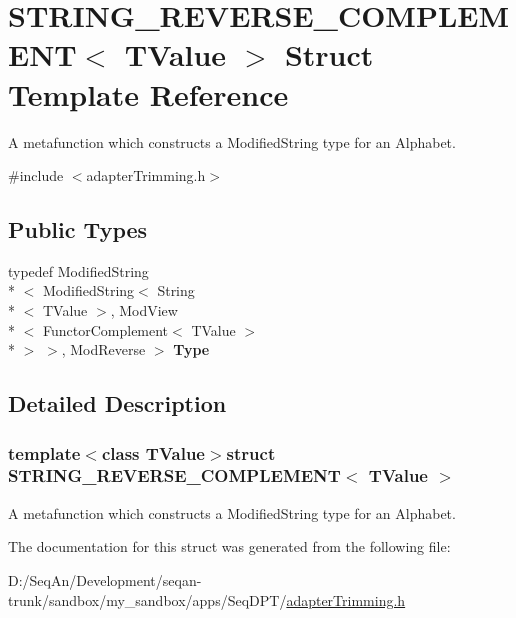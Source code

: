 \hypertarget{struct_s_t_r_i_n_g___r_e_v_e_r_s_e___c_o_m_p_l_e_m_e_n_t}{\section{S\-T\-R\-I\-N\-G\-\_\-\-R\-E\-V\-E\-R\-S\-E\-\_\-\-C\-O\-M\-P\-L\-E\-M\-E\-N\-T$<$ T\-Value $>$ Struct Template Reference}
\label{struct_s_t_r_i_n_g___r_e_v_e_r_s_e___c_o_m_p_l_e_m_e_n_t}
}


A metafunction which constructs a Modified\-String type for an Alphabet.  




{\ttfamily \#include $<$adapter\-Trimming.\-h$>$}

\subsection*{Public Types}
\begin{DoxyCompactItemize}
\item 
\hypertarget{struct_s_t_r_i_n_g___r_e_v_e_r_s_e___c_o_m_p_l_e_m_e_n_t_a6bd7f83c07f52c09bc4e5304fb416fb7}{typedef Modified\-String\\*
$<$ Modified\-String$<$ String\\*
$<$ T\-Value $>$, Mod\-View\\*
$<$ Functor\-Complement$<$ T\-Value $>$\\*
 $>$ $>$, Mod\-Reverse $>$ {\bfseries Type}}\label{struct_s_t_r_i_n_g___r_e_v_e_r_s_e___c_o_m_p_l_e_m_e_n_t_a6bd7f83c07f52c09bc4e5304fb416fb7}

\end{DoxyCompactItemize}


\subsection{Detailed Description}
\subsubsection*{template$<$class T\-Value$>$struct S\-T\-R\-I\-N\-G\-\_\-\-R\-E\-V\-E\-R\-S\-E\-\_\-\-C\-O\-M\-P\-L\-E\-M\-E\-N\-T$<$ T\-Value $>$}

A metafunction which constructs a Modified\-String type for an Alphabet. 

The documentation for this struct was generated from the following file\-:\begin{DoxyCompactItemize}
\item 
D\-:/\-Seq\-An/\-Development/seqan-\/trunk/sandbox/my\-\_\-sandbox/apps/\-Seq\-D\-P\-T/\hyperlink{adapter_trimming_8h}{adapter\-Trimming.\-h}\end{DoxyCompactItemize}
